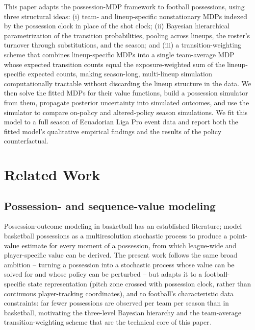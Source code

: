 \documentclass[11pt]{article}
\theoremstyle{plain}
\theoremstyle{definition}
\theoremstyle{remark}
\begin{document}
This paper adapts the possession-MDP framework to football possessions, using three structural ideas: (i) team- and lineup-specific nonstationary MDPs indexed by the possession clock in place of the shot clock; (ii) Bayesian hierarchical parametrization of the transition probabilities, pooling across lineups, the roster's turnover through substitutions, and the season; and (iii) a transition-weighting scheme that combines lineup-specific MDPs into a single team-average MDP whose expected transition counts equal the exposure-weighted sum of the lineup-specific expected counts, making season-long, multi-lineup simulation computationally tractable without discarding the lineup structure in the data. We then solve the fitted MDPs for their value functions, build a possession simulator from them, propagate posterior uncertainty into simulated outcomes, and use the simulator to compare on-policy and altered-policy season simulations. We fit this model to a full season of Ecuadorian Liga Pro event data and report both the fitted model's qualitative empirical findings and the results of the policy counterfactual.

\section{Related Work}
\label{sec:related}

\subsection{Possession- and sequence-value modeling}
Possession-outcome modeling in basketball has an established literature; \citet{cervone2016multiresolution} model basketball possessions as a multiresolution stochastic process to produce a point-value estimate for every moment of a possession, from which league-wide and player-specific value can be derived. The present work follows the same broad ambition -- turning a possession into a stochastic process whose value can be solved for and whose policy can be perturbed -- but adapts it to a football-specific state representation (pitch zone crossed with possession clock, rather than continuous player-tracking coordinates), and to football's characteristic data constraints: far fewer possessions are observed per team per season than in basketball, motivating the three-level Bayesian hierarchy and the team-average transition-weighting scheme that are the technical core of this paper.
\end{document}
